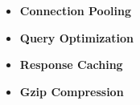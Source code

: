\begin{itemize}
    \item \textbf{Connection Pooling}%
    
    \item \textbf{Query Optimization}%
    
    \item \textbf{Response Caching}%
    
    \item \textbf{Gzip Compression}%
\end{itemize}



    
    
    
    
